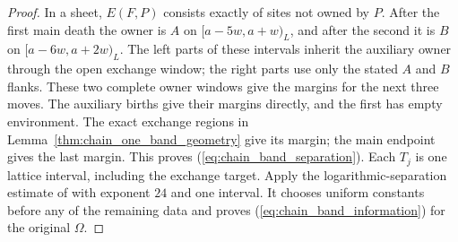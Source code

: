 \begin{proof}
    \leanok
    In a sheet, $E(F,P)$ consists exactly of sites not
    owned by $P$. After the first main death the owner is $A$ on
    $[a-5w,a+w)_L$, and after the second it is $B$ on
    $[a-6w,a+2w)_L$. The left parts of these intervals inherit the
    auxiliary owner through the open exchange window; the right parts
    use only the stated $A$ and $B$ flanks. These two complete owner
    windows give the margins for the next three moves. The auxiliary
    births give their margins directly, and the first has empty
    environment. The exact exchange regions in
    Lemma~\ref{thm:chain_one_band_geometry} give its margin; the main
    endpoint gives the last margin. This proves
    (\ref{eq:chain_band_separation}).
    Each $T_j$ is one lattice interval, including the exchange
    target. Apply the logarithmic-separation estimate of
    \cite[Part~II, the lemma on information at logarithmic separation]{TNLean2026OneDimensional}
    with exponent $24$ and one interval. It chooses uniform constants
    before any of the remaining data and proves
    (\ref{eq:chain_band_information}) for the original $\Omega$.
\end{proof}

